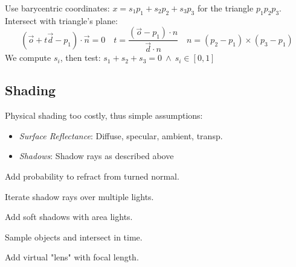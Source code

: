 \begin{definition}[Triangle]
  Use barycentric coordinates: \(x = s_1 p_1 + s_2 p_2 + s_3 p_3\) for the triangle \(p_1p_2p_3\).
  Intersect with triangle's plane:
  \[(\vec{o} + t\vec{d} - p_1) \cdot \vec{n} = 0 \quad t = \frac{(\vec{o} - p_1) \cdot n}{\vec{d} \cdot n} \quad n = (p_2 - p_1) \times (p_3 - p_1)\]
  We compute \(s_i\), then test: \(s_1 + s_2 + s_3 = 0 \ \land \ s_i \in [0,1]\)
\end{definition}

\subsection{Shading}
Physical shading too costly, thus simple assumptions:
\begin{itemize}
  \item \textit{Surface Reflectance}: Diffuse, specular, ambient, transp.
  \item \textit{Shadows}: Shadow rays as described above
\end{itemize}

\begin{definition}[Refraction]
  Add probability to refract from turned normal.
\end{definition}

\begin{definition}
  Iterate shadow rays over multiple lights.
\end{definition}

\begin{definition}
  Add soft shadows with area lights.
\end{definition}

\begin{definition}
  Sample objects and intersect in time.
\end{definition}

\begin{definition}
  Add virtual "lens" with focal length.
\end{definition}
